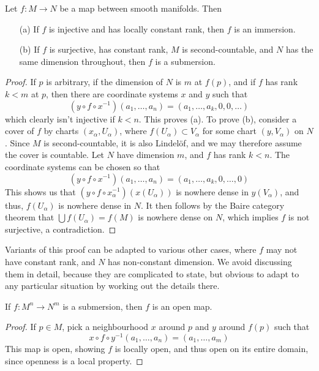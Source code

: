 \begin{theorem}
    Let $f: M \to N$ be a map between smooth manifolds. Then
    \begin{enumerate}
        \item[(a)] If $f$ is injective and has locally constant rank, then $f$ is an immersion.
        \item[(b)] If $f$ is surjective, has constant rank, $M$ is second-countable, and $N$ has the same dimension throughout, then $f$ is a submersion.
    \end{enumerate}
\end{theorem}
\begin{proof}
    If $p$ is arbitrary, if the dimension of $N$ is $m$ at $f(p)$, and if $f$ has rank $k < m$ at $p$, then there are coordinate systems $x$ and $y$ such that
    \[ (y \circ f \circ x^{-1})(a_1, \dots, a_n) = (a_1, \dots, a_k, 0, 0, \dots) \]
    which clearly isn't injective if $k < n$. This proves (a). To prove (b), consider a cover of $f$ by charts $(x_\alpha, U_\alpha)$, where $f(U_\alpha) \subset V_\alpha$ for some chart $(y,V_\alpha)$ on $N$. Since $M$ is second-countable, it is also Lindel\"{o}f, and we may therefore assume the cover is countable. Let $N$ have dimension $m$, and $f$ has rank $k < n$. The coordinate systems can be chosen so that
    \[ (y \circ f \circ x^{-1})(a_1, \dots, a_n) = (a_1, \dots, a_k, 0, \dots, 0) \]
    This shows us that $(y \circ f \circ x_\alpha^{-1})(x(U_\alpha))$ is nowhere dense in $y(V_\alpha)$, and thus, $f(U_\alpha)$ is nowhere dense in $N$. It then follows by the Baire category theorem that $\bigcup f(U_\alpha) = f(M)$ is nowhere dense on $N$, which implies $f$ is not surjective, a contradiction.
\end{proof}

Variants of this proof can be adapted to various other cases, where $f$ may not have constant rank, and $N$ has non-constant dimension. We avoid discussing them in detail, because they are complicated to state, but obvious to adapt to any particular situation by working out the details there.

\begin{theorem}
    If $f:M^n \to N^m$ is a submersion, then $f$ is an open map.
\end{theorem}
\begin{proof}
    If $p \in M$, pick a neighbourhood $x$ around $p$ and $y$ around $f(p)$ such that
    \[ x \circ f \circ y^{-1}(a_1, \dots, a_n) = (a_1, \dots, a_m) \]
    This map is open, showing $f$ is locally open, and thus open on its entire domain, since openness is a local property.
\end{proof}

